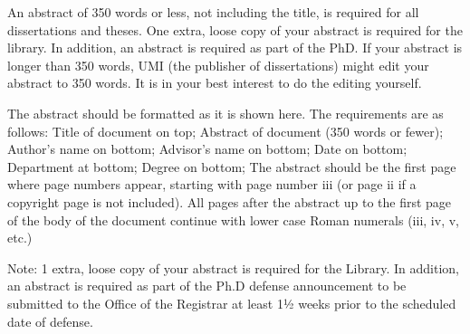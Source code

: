 
%
An abstract of 350 words or less, not including the title, is required for all dissertations and theses. One extra, loose copy of your abstract is required for the library. In addition, an abstract is required as part of the PhD.  If your abstract is longer than 350 words, UMI (the publisher of dissertations) might edit your abstract to 350 words. It is in your best interest to do the editing yourself.  

The abstract should be formatted as it is shown here.  The requirements are as follows:   Title of document on top;  Abstract of document (350 words or fewer); Author's name on bottom; Advisor's name on bottom; Date on bottom; Department at bottom; Degree on bottom; The abstract should be the first page where page numbers appear, starting with page number iii (or page ii if a copyright page is not included). All pages after the abstract up to the first page of the body of the document continue with lower case Roman numerals (iii, iv, v, etc.)

Note: 1 extra, loose copy of your abstract is required for the Library. In addition, an abstract is required as part of the Ph.D defense announcement to be submitted to the Office of the Registrar at least 1½ weeks prior to the scheduled date of defense. 

